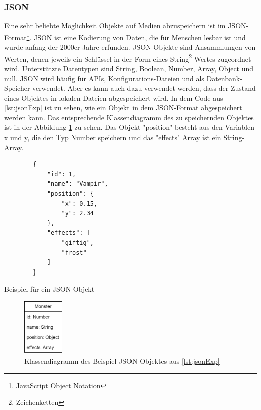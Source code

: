 \subsubsection{JSON}
Eine sehr beliebte Möglichkeit Objekte auf Medien abzuspeichern ist im JSON-Format\footnote{JavaScript Object Notation }. JSON ist eine Kodierung von Daten, die für Menschen lesbar ist und wurde anfang der 2000er Jahre erfunden. JSON Objekte sind Ansammlungen von Werten, denen jeweils ein Schlüssel in der Form eines String\footnote{Zeichenketten}-Wertes zugeordnet wird. Unterstützte Datentypen sind String, Boolean, Number, Array, Object und null. JSON wird häufig für APIs, Konfigurations-Dateien und als Datenbank-Speicher verwendet. Aber es kann auch dazu verwendet werden, dass der Zustand eines Objektes in lokalen Dateien abgespeichert wird.\cite{mongodbJSONBSON} 
In dem Code aus \ref{lst:jsonExp} ist zu sehen, wie ein Objekt in dem JSON-Format abgespeichert werden kann. Das entsprechende Klassendiagramm des zu speichernden Objektes ist in der Abbildung \ref{fig:monsterBspKlasse} zu sehen. Das Objekt "position" besteht aus den Variablen x und y, die den Typ Number speichern und das "effects" Array ist ein String-Array. 

\begin{listing}[htp]
    \begin{verbatim}
        {
            "id": 1,
            "name": "Vampir",
            "position": {
                "x": 0.15,
                "y": 2.34
            },
            "effects": [
                "giftig", 
                "frost"
            ]
        }
    \end{verbatim}
    \caption{Beispiel für ein JSON-Objekt}
    \label{lst:jsonExp}
\end{listing}

\begin{figure}[htp]
    \centering
    \includegraphics[width=0.18\textwidth]{images/MonsterBspKlasse.png}
    \caption{Klassendiagramm des Beispiel JSON-Objektes aus \ref{lst:jsonExp}}
    \label{fig:monsterBspKlasse}
\end{figure}

